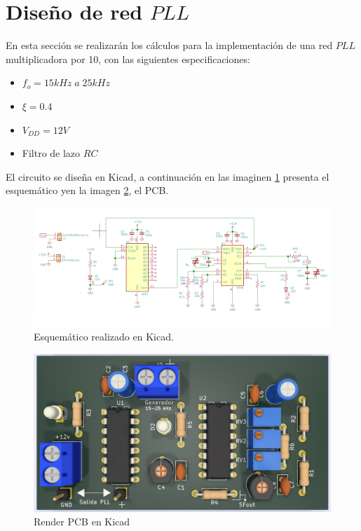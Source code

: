 \documentclass[twocolumn]{article}
\begin{document}
\section{Diseño de red $PLL$}
En esta sección se realizarán los cálculos para la implementación de una red $PLL$ multiplicadora por 10, con las siguientes especificaciones:
\begin{itemize}\itemsep0em
\item $f_o = 15 kHz \; a  \; 25kHz $
	\item $\xi = 0.4$
	\item $V_{DD} = 12 V$
	\item Filtro de lazo $RC$
\end{itemize}

El circuito se diseña en Kicad, a continuación en las imaginen \textcolor{blue}{{\ref{fig:sch}}} presenta el esquemático yen la imagen \textcolor{blue}{{\ref{fig:pcb1}}}, el PCB.
\begin{figure}[H]
  \centering    
  \includegraphics[width=\columnwidth]{imagenes/sch.jpg}
	\caption{Esquemático realizado en Kicad.}\label{fig:sch}
\end{figure}

\begin{figure}[H]
  \centering    
  \includegraphics[width=\columnwidth]{imagenes/pcb1.jpg}
	\caption{Render PCB en Kicad}\label{fig:pcb1}
\end{figure}
\end{document}
